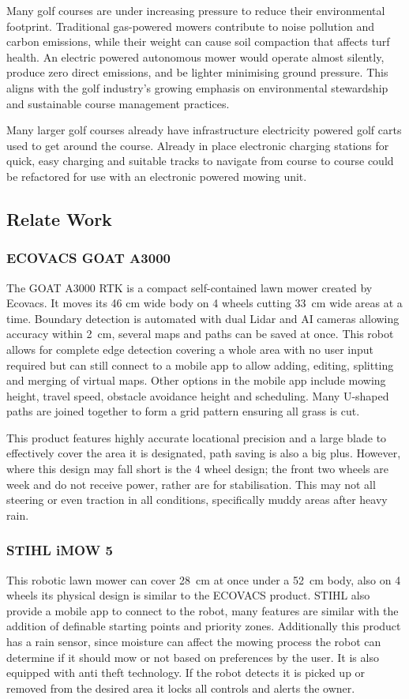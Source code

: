 \documentclass[final]{cmpreport_02}
\begin{document}
Many golf courses are under increasing pressure to reduce their environmental footprint. Traditional gas-powered mowers contribute to noise pollution and carbon emissions, while their weight can cause soil compaction that affects turf health.
An electric powered autonomous mower would operate almost silently, produce zero direct emissions, and be lighter minimising ground pressure. This aligns with the golf industry's growing emphasis on environmental stewardship and sustainable course management practices.

Many larger golf courses already have infrastructure electricity powered golf carts used to get around the course.
Already in place electronic charging stations for quick, easy charging and suitable tracks to navigate from course to course could be refactored for use with an electronic powered mowing unit.

\subsection{Relate Work}
\subsubsection{ECOVACS GOAT A3000}
The GOAT A3000 RTK \citep{goata3000} is a compact self-contained lawn mower created by Ecovacs.
It moves its 46 cm wide body on 4 wheels cutting 33 cm wide areas at a time.
Boundary detection is automated with dual Lidar and AI cameras allowing accuracy within 2 cm, several maps and paths can be saved at once.
This robot allows for complete edge detection covering a whole area with no user input required but can still connect to a mobile app to allow adding, editing, splitting and merging of virtual maps.
Other options in the mobile app include mowing height, travel speed, obstacle avoidance height and scheduling.
Many U-shaped paths are joined together to form a grid pattern ensuring all grass is cut.

This product features highly accurate locational precision and a large blade to effectively cover the area it is designated, path saving is also a big plus.
However, where this design may fall short is the 4 wheel design; the front two wheels are week and do not receive power, rather are for stabilisation. This may not all steering or even traction in all conditions, specifically muddy areas after heavy rain.

\subsubsection{STIHL iMOW 5}
This robotic lawn mower \citep{imow5} can cover 28 cm at once under a 52 cm body, also on 4 wheels its physical design is similar to the ECOVACS product.
STIHL also provide a mobile app to connect to the robot, many features are similar with the addition of definable starting points and priority zones.
Additionally this product has a rain sensor, since moisture can affect the mowing process the robot can determine if it should mow or not based on preferences by the user.
It is also equipped with anti theft technology. If the robot detects it is picked up or removed from the desired area it locks all controls and alerts the owner.
\end{document}
